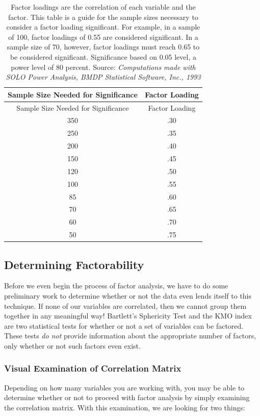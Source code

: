 \documentclass[
]{article}
\theoremstyle{definition}
\theoremstyle{definition}
\theoremstyle{definition}
\theoremstyle{definition}
\theoremstyle{remark}
\begin{document}
\begin{longtable}[]{@{}cc@{}}
\caption{Factor loadings are the correlation of each variable and the factor. This table is a guide for the sample sizes necessary to consider a factor loading significant. For example, in a sample of 100, factor loadings of 0.55 are considered significant. In a sample size of 70, however, factor loadings must reach 0.65 to be considered significant. Significance based on 0.05 level, a power level of 80 percent. Source: \emph{Computations made with SOLO Power Analysis, BMDP Statistical Software, Inc., 1993}}\tabularnewline
\toprule
Sample Size Needed for Significance & Factor Loading\tabularnewline
\midrule
\endfirsthead
\toprule
Sample Size Needed for Significance & Factor Loading\tabularnewline
\midrule
\endhead
350 & .30\tabularnewline
250 & .35\tabularnewline
200 & .40\tabularnewline
150 & .45\tabularnewline
120 & .50\tabularnewline
100 & .55\tabularnewline
85 & .60\tabularnewline
70 & .65\tabularnewline
60 & .70\tabularnewline
50 & .75\tabularnewline
\bottomrule
\end{longtable}

\hypertarget{determining-factorability}{%
\subsection{Determining Factorability}\label{determining-factorability}}

Before we even begin the process of factor analysis, we have to do some preliminary work to determine whether or not the data even lends itself to this technique. If none of our variables are correlated, then we cannot group them together in any meaningful way! Bartlett's Sphericity Test and the KMO index are two statistical tests for whether or not a set of variables can be factored. These tests \emph{do not} provide information about the appropriate number of factors, only whether or not such factors even exist.

\hypertarget{visual-examination-of-correlation-matrix}{%
\subsubsection{Visual Examination of Correlation Matrix}\label{visual-examination-of-correlation-matrix}}

Depending on how many variables you are working with, you may be able to determine whether or not to proceed with factor analysis by simply examining the correlation matrix. With this examination, we are looking for two things:
\end{document}
